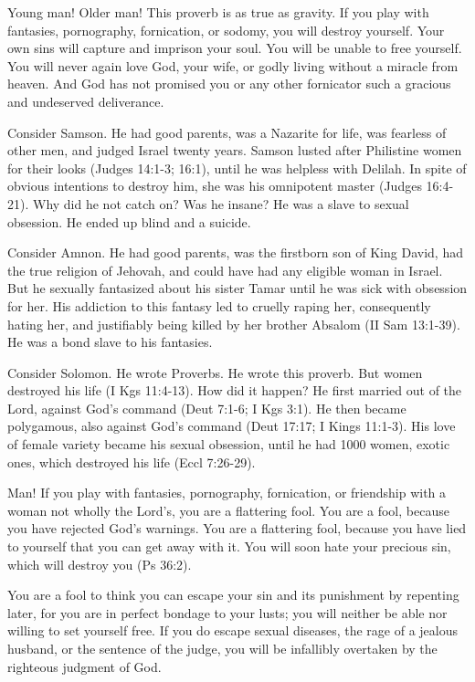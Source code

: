 Young man! Older man! This proverb is as true as gravity. If you play with fantasies, pornography, fornication, or sodomy, you will destroy yourself. Your own sins will capture and imprison your soul. You will be unable to free yourself. You will never again love God, your wife, or godly living without a miracle from heaven. And God has not promised you or any other fornicator such a gracious and undeserved deliverance.

Consider Samson. He had good parents, was a Nazarite for life, was fearless of other men, and judged Israel twenty years. Samson lusted after Philistine women for their looks (Judges 14:1-3; 16:1), until he was helpless with Delilah. In spite of obvious intentions to destroy him, she was his omnipotent master (Judges 16:4-21). Why did he not catch on? Was he insane? He was a slave to sexual obsession. He ended up blind and a suicide.

Consider Amnon. He had good parents, was the firstborn son of King David, had the true religion of Jehovah, and could have had any eligible woman in Israel. But he sexually fantasized about his sister Tamar until he was sick with obsession for her. His addiction to this fantasy led to cruelly raping her, consequently hating her, and justifiably being killed by her brother Absalom (II Sam 13:1-39). He was a bond slave to his fantasies.

Consider Solomon. He wrote Proverbs. He wrote this proverb. But women destroyed his life (I Kgs 11:4-13). How did it happen? He first married out of the Lord, against God’s command (Deut 7:1-6; I Kgs 3:1). He then became polygamous, also against God’s command (Deut 17:17; I Kings 11:1-3). His love of female variety became his sexual obsession, until he had 1000 women, exotic ones, which destroyed his life (Eccl 7:26-29).

Man! If you play with fantasies, pornography, fornication, or friendship with a woman not wholly the Lord’s, you are a flattering fool. You are a fool, because you have rejected God’s warnings. You are a flattering fool, because you have lied to yourself that you can get away with it. You will soon hate your precious sin, which will destroy you (Ps 36:2).

You are a fool to think you can escape your sin and its punishment by repenting later, for you are in perfect bondage to your lusts; you will neither be able nor willing to set yourself free. If you do escape sexual diseases, the rage of a jealous husband, or the sentence of the judge, you will be infallibly overtaken by the righteous judgment of God.

